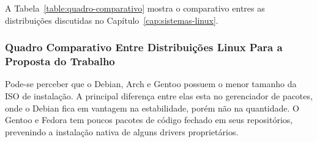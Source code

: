 \documentclass[
article,			%
12pt,				%
openright,			%
oneside,			%
a4paper,			%
chapter=TITLE,		%
section=TITLE,		%
subsection=TITLE,	%
subsubsection=TITLE,%
subsubsubsection=TITLE, %
english,			%
brazil,				%
]{abntex2}
\begin{document}
A Tabela~\ref{table:quadro-comparativo} mostra o comparativo entres as
distribuições discutidas no Capítulo~\ref{cap:sistemas-linux}.

\subsubsection[Comparativo Entre Distribuições Linux Para a
Proposta do Trabalho]{Quadro Comparativo Entre Distribuições Linux Para a
Proposta do Trabalho}

\begin{table}[H]
    \centering
    \caption{\label{table:quadro-comparativo}Quadro Comparativo Entre
    Distribuições Linux}
\end{table}

Pode-se perceber que o Debian, Arch e Gentoo possuem o menor tamanho
da ISO de instalação. A principal diferença entre elas esta no
gerenciador de pacotes, onde o Debian fica em vantagem na
estabilidade, porém não na quantidade. O Gentoo e Fedora tem poucos
pacotes de código fechado em seus repositórios, prevenindo a
instalação nativa de alguns drivers proprietários.
\end{document}
